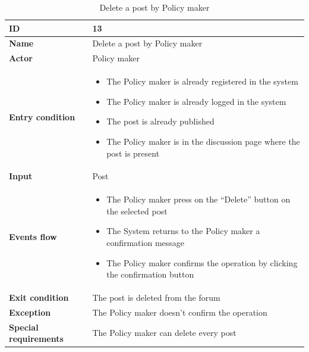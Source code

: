 \begin{longtable}{p{} | p{}}
        \caption{Delete a post by Policy maker}
    \label{tab:pm_delete_post}\\
        \hline
        \textbf{ID} & 13\\
        \hline
        \textbf{Name}  &  Delete a post by Policy maker\\
        \hline
        \textbf{Actor}  &  Policy maker\\
        \hline
        \textbf{Entry condition}  &  \begin{itemize}
            \item  The Policy maker is already registered in the system
            \item  The Policy maker is already logged in the system
            \item The post is already published
            \item  The Policy maker is in the discussion page where the post is present
        \end{itemize}\\
        \hline
        \textbf{Input} & Post\\
        \hline
        \textbf{Events flow} & \begin{itemize}
                \item The Policy maker press on the “Delete” button on the selected post
                \item The System returns to the Policy maker a confirmation message
                \item The Policy maker confirms the operation by clicking the confirmation button
                \end{itemize}
                 \\
        \hline
        \textbf{Exit condition} & The post is deleted from the forum\\
        \hline
        \textbf{Exception} & The Policy maker doesn't confirm the operation\\ \hline
        \textbf{Special requirements} & The Policy maker can delete every post\\ \hline

    \end{longtable}
    
